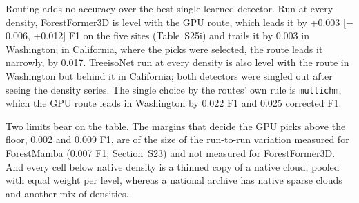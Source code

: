 \documentclass[10pt]{article}
\begin{document}
Routing adds no accuracy over the best single learned detector. Run at every
density, ForestFormer3D is level with the GPU route, which leads it by +0.003
[$-$0.006, +0.012] F1 on the five sites (Table~S25i) and trails it by 0.003 in
Washington; in California, where the picks were selected, the route leads it
narrowly, by 0.017. TreeisoNet run at every density is also level with the route
in Washington but behind it in California; both detectors were singled out after
seeing the density series. The single choice by the routes' own rule is
\texttt{multichm}, which the GPU route leads in Washington by 0.022 F1 and 0.025
corrected F1.

Two limits bear on the table. The margins that decide the GPU picks above the
floor, 0.002 and 0.009 F1, are of the size of the run-to-run variation measured
for ForestMamba (0.007 F1; Section~S23) and not measured for ForestFormer3D. And
every cell below native density is a thinned copy of a native cloud, pooled with
equal weight per level, whereas a national archive has native sparse clouds and
another mix of densities.
\end{document}
